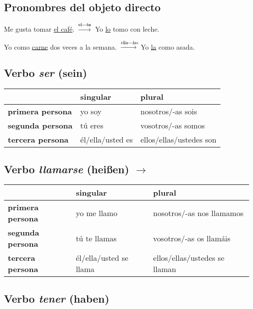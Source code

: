 \documentclass{article}
\begin{document}
	\subsection{Pronombres del objeto directo}
	
	Me gusta tomar \underline{el café}. $\xrightarrow{\text{el} \to \text{to}}$ Yo \underline{lo} tomo con leche.
	
	Yo como \underline{carne} dos veces a la semana. $\xrightarrow{\text{ella} \to \text{la}}$ Yo \underline{la} como asada.
	
	\subsection{Verbo \textit{ser} (sein)}
	
	\begin{center}
		\begin{tabular}{l|l|l}
			& \textbf{singular} & \textbf{plural} \\
			\hline
			\textbf{primera persona} & yo soy & nosotros/-as sois \\
			\hline
			\textbf{segunda persona} & tú eres & vosotros/-as somos \\
			\hline
			\textbf{tercera persona} & él/ella/usted es &ellos/ellas/ustedes son
		\end{tabular}
	\end{center}
	
	\subsection{Verbo \textit{llamarse} (heißen) $\to$ }
	
	\begin{center}
		\begin{tabular}{l|l|l}
			& \textbf{singular} & \textbf{plural} \\
			\hline
			\textbf{primera persona} & yo me llamo & nosotros/-as nos llamamos \\
			\hline
			\textbf{segunda persona} & tú te llamas & vosotros/-as os llamáis \\
			\hline
			\textbf{tercera persona} & él/ella/usted se llama & ellos/ellas/ustedes se llaman
		\end{tabular}
	\end{center}
	
	\subsection{Verbo \textit{tener} (haben)}
	
\end{document}
